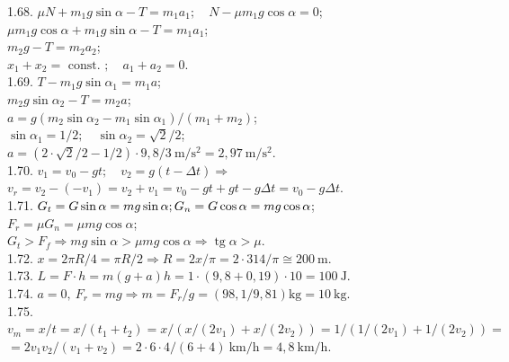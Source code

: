 1.68. $\mu N+m_{1} g \sin \alpha-T=m_{1} a_{1}; \quad N-\mu m_{1} g \cos \alpha=0$;\\ $\mu m_{1} g \cos \alpha+m_{1} g \sin \alpha-T=m_{1} a_{1}$;\\ $m_{2} g-T=m_{2} a_{2}$;\\ $x_{1}+x_{2}=\text { const. }; \quad a_{1}+a_{2}=0$.\\

1.69. $T-m_{1} g \sin \alpha_{1}=m_{1} a$;\\ $m_{2} g \sin \alpha_{2}-T=m_{2} a$;\\ $a=g\left(m_{2} \sin \alpha_{2}-m_{1} \sin \alpha_{1}\right) /\left(m_{1}+m_{2}\right)$;\\ $\sin \alpha_{1}=1 / 2; \quad \sin \alpha_{2}=\sqrt{2} / 2$;\\ $a=(2 \cdot \sqrt{2} / 2-1 / 2) \cdot 9,8 / 3 \mathrm{~m} / \mathrm{s}^{2}=2,97 \mathrm{~m} / \mathrm{s}^{2}$.\\

1.70. $v_{1}=v_{0}-g t; \quad v_{2}=g(t-\Delta t) \Rightarrow$\\ $v_{r}=v_{2}-\left(-v_{1}\right)=v_{2}+v_{1}=v_{0}-g t+g t-g \Delta t=v_{0}-g \Delta t$.\\

1.71. $G_{t}=G \sin \alpha=m g \sin \alpha;\\ G_{n}=G \cos \alpha=m g \cos \alpha$;\\ $F_{r}=\mu G_{n}=\mu m g \cos \alpha$;\\ $G_{t}>F_{f} \Rightarrow m g \sin \alpha>\mu m g \cos \alpha \Rightarrow \operatorname{tg} \alpha>\mu$.\\

1.72. $x=2 \pi R / 4=\pi R / 2 \Rightarrow R=2 x / \pi=2 \cdot 314 / \pi \cong 200 \mathrm{~m}$.\\

1.73. $L=F \cdot h=m(g+a) h=1 \cdot(9,8+0,19) \cdot 10=100 \mathrm{~J}$.\\

1.74. $a=0,\ F_{r}=m g \Rightarrow m=F_{r} / g=(98,1 / 9,81) \mathrm{kg}=10 \mathrm{~kg}$.\\

1.75. $v_{m}=x / t=x /\left(t_{1}+t_{2}\right)=x /\left(x /\left(2 v_{1}\right)+x /\left(2 v_{2}\right)\right)=1 /\left(1 /\left(2 v_{1}\right)+1 /\left(2 v_{2}\right)\right)=$ $=2 v_{1} v_{2} /\left(v_{1}+v_{2}\right)=2 \cdot 6 \cdot 4 /(6+4) \mathrm{~km} / \mathrm{h}=4,8 \mathrm{~km} / \mathrm{h}$.\\

